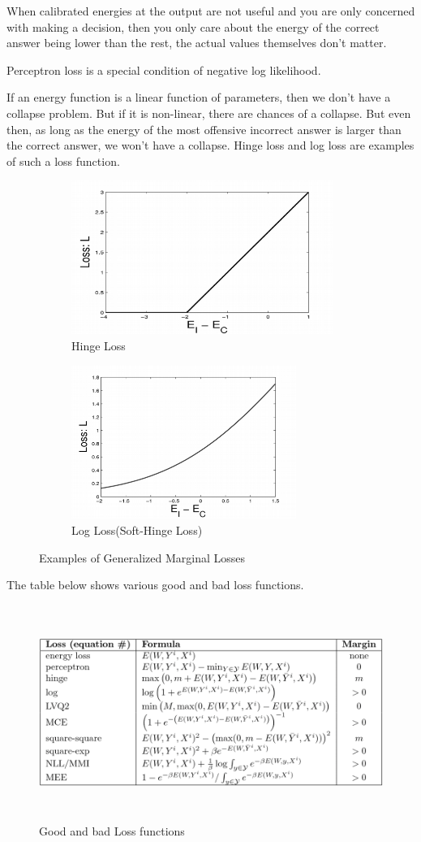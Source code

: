 When calibrated energies at the output are not useful and you are only concerned with making a decision, then you only care about the energy of the correct answer being lower than the rest, the actual values themselves don't matter.

Perceptron loss is a special condition of negative log likelihood.

If an energy function is a linear function of parameters, then we don't have a collapse problem. But if it is non-linear, there are chances of a collapse.
But even then, as long as  the energy of the most offensive incorrect answer is larger than the correct answer, we won't have a collapse. Hinge loss and log loss are examples of such a loss function. 

\begin{figure}[h]
 
\begin{subfigure}{0.5\textwidth}
\includegraphics[width=0.9\linewidth, height=5cm]{figs/Hinge.png} 
\caption{Hinge Loss}
\label{fig:subim1}
\end{subfigure}
\begin{subfigure}{0.5\textwidth}
\includegraphics[width=0.9\linewidth, height=5cm]{figs/Log_Loss.png}
\caption{Log Loss(Soft-Hinge Loss)}
\label{fig:subim2}
\end{subfigure}
 
\caption{Examples of Generalized Marginal Losses}
\label{fig:image2}
\end{figure}
\pagebreak The table below shows various good and bad loss functions.
\begin{figure}[ht]
\centering
\includegraphics[width=150mm,height=7cm]{figs/Good_Bad_Loss.png}
\caption{Good and bad Loss functions}
\end{figure}
 